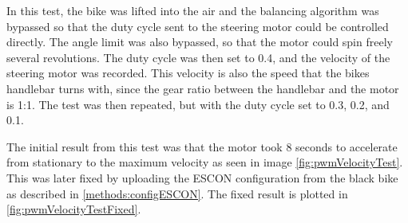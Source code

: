 In this test, the bike was lifted into the air and the balancing algorithm was bypassed so that the duty cycle sent to the steering motor could be controlled directly. The angle limit was also bypassed, so that the motor could spin freely several revolutions. The duty cycle was then set to 0.4, and the velocity of the steering motor was recorded. This velocity is also the speed that the bikes handlebar turns with, since the gear ratio between the handlebar and the motor is 1:1. The test was then repeated, but with the duty cycle set to 0.3, 0.2, and 0.1.

The initial result from this test was that the motor took 8 seconds to accelerate from stationary to the maximum velocity as seen in image \ref{fig:pwmVelocityTest}. This was later fixed by uploading the ESCON configuration from the black bike as described in \ref{methods:configESCON}. The fixed result is plotted in \ref{fig:pwmVelocityTestFixed}.

